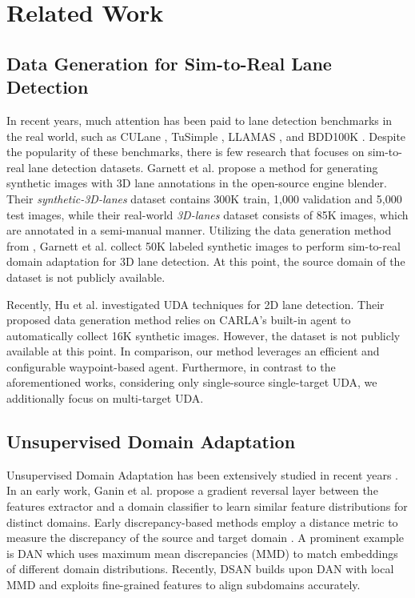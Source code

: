 \documentclass{article}
\begin{document}
	
	\section{Related Work}
	
	\subsection{Data Generation for Sim-to-Real Lane Detection}
	
	In recent years, much attention has been paid to lane detection benchmarks in the real world, such as CULane \cite{pan2018SCNN}, TuSimple \cite{TuSimple2017}, LLAMAS \cite{llamas2019}, and BDD100K \cite{BDD100k}. Despite the popularity of these benchmarks, there is few research that focuses on sim-to-real lane detection datasets. Garnett et al. \cite{Garnett2019} propose a method for generating synthetic images with 3D lane annotations in the open-source engine blender. Their \textit{synthetic-3D-lanes} dataset contains 300K train, 1,000 validation and 5,000 test images, while their real-world \textit{3D-lanes} dataset consists of 85K images, which are annotated in a semi-manual manner. Utilizing the data generation method from \cite{Garnett2019}, Garnett et al. \cite{Garnett2020} collect 50K labeled synthetic images to perform sim-to-real domain adaptation for 3D lane detection. At this point, the source domain of the dataset is not publicly available. 
	
	Recently, Hu et al. \cite{SimuLanes2022} investigated UDA techniques for 2D lane detection. Their proposed data generation method relies on CARLA's built-in agent to automatically collect 16K synthetic images. However, the dataset is not publicly available at this point. In comparison, our method leverages an efficient and configurable waypoint-based agent. Furthermore, in contrast to the aforementioned works, considering only single-source single-target UDA, we additionally focus on multi-target UDA.
	
	\subsection{Unsupervised Domain Adaptation}
	Unsupervised Domain Adaptation has been extensively studied in recent years \cite{wilson2020survey}. 
	In an early work, Ganin et al. \cite{ganin2015unsupervised} propose a gradient reversal layer between the features extractor and a domain classifier to learn similar feature distributions for distinct domains. 
	Early discrepancy-based methods employ a distance metric to measure the discrepancy of the source and target domain \cite{Long2015DAN, SunCORAL}. A prominent example is DAN \cite{Long2015DAN} which uses maximum mean discrepancies (MMD) \cite{Gretton2007, Gretton2012} to match embeddings of different domain distributions. Recently, DSAN \cite{ZhuDSAN2020} builds upon DAN with local MMD and exploits fine-grained features to align subdomains accurately. 
	
\end{document}
